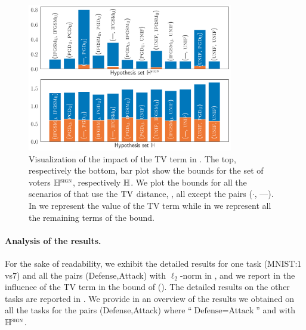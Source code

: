 
\begin{figure}
    \centering
    \includegraphics[width=0.8\textwidth]{chapter_3/figures/bar.pdf}
    \caption[Visualization of the impact of the TV term in ]{Visualization of the impact of the TV term in .
    The top, respectively the bottom, bar plot show the bounds for the set of voters $\mathbb{H}^{\text{{\sc sign}}}$, respectively $\mathbb{H}$.
    We plot the bounds for all the scenarios of  that use the ${\rm TV}$ distance, \ie, all except the pairs ($\cdot$, ---).
    In  we represent the value of the TV term while in  we represent all the remaining terms of the bound.
    }
    \label{chap:mv-robustness:fig:tv-in-bound}
\end{figure}

\paragraph{Analysis of the results.} For the sake of readability, we exhibit the detailed results for one task (MNIST:$1$vs$7$) and all the pairs (Defense,Attack) with $\ell_2$-norm in , and we report in  the influence of the TV term in the bound of  ().
The detailed results on the other tasks are reported in .
We provide in  an overview of the results we obtained on all the tasks for the pairs (Defense,Attack) where ``$\text{Defense}{=}\text{Attack}$'' and with $\mathbb{H}^{\text{{\sc sign}}}$. 



